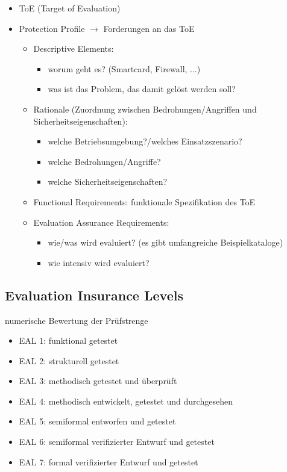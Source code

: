 \documentclass[a4paper,twoside,DIV15,BCOR12mm]{scrbook}
\begin{document}
\begin{itemize}
	\item ToE (Target of Evaluation)
	\item Protection Profile $\rightarrow$ Forderungen an das ToE
		\begin{itemize}
			\item Descriptive Elements:
				\begin{itemize}
					\item worum geht es? (Smartcard, Firewall, ...)
					\item was ist das Problem, das damit gelöst werden soll?
				\end{itemize}
			\item Rationale (Zuordnung zwischen Bedrohungen/Angriffen und Sicherheitseigenschaften):
				\begin{itemize}
					\item welche Betriebsumgebung?/welches Einsatzszenario?
					\item welche Bedrohungen/Angriffe?
					\item welche Sicherheitseigenschaften?
				\end{itemize}
			\item Functional Requirements: funktionale Spezifikation des ToE
			\item Evaluation Assurance Requirements:
				\begin{itemize}
					\item wie/was wird evaluiert? (es gibt umfangreiche Beispielkataloge)
					\item wie intensiv wird evaluiert?
				\end{itemize}
		\end{itemize}
\end{itemize}

\subsection{Evaluation Insurance Levels}

numerische Bewertung der Prüfstrenge

\begin{itemize}
	\item EAL 1: funktional getestet
	\item EAL 2: strukturell getestet
	\item EAL 3: methodisch getestet und überprüft
	\item EAL 4: methodisch entwickelt, getestet und durchgesehen
	\item EAL 5: semiformal entworfen und getestet
	\item EAL 6: semiformal verifizierter Entwurf und getestet
	\item EAL 7: formal verifizierter Entwurf und getestet
\end{itemize}
\end{document}

